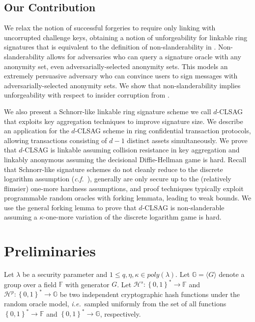 \documentclass{llncs}
\begin{document}
\subsection{Our Contribution}

We relax the notion of successful forgeries to require only linking with uncorrupted challenge keys, obtaining a notion of unforgeability for linkable ring signatures that is equivalent to the definition of non-slanderability in \cite{au2006short}.  Non-slanderability allows for adversaries who can query a signature oracle with any anonymity set, even adversarially-selected anonymity sets. This models an extremely persuasive adversary who can convince users to sign messages with adversarially-selected anonymity sets. We show that non-slanderability implies unforgeability with respect to insider corruption from \cite{bender2006ring}.

We also present a Schnorr-like linkable ring signature scheme we call $d$-CLSAG that exploits key aggregation techniques to improve signature size. We describe an application for the $d$-CLSAG scheme in ring confidential transaction protocols, allowing transactions consisting of $d-1$ distinct assets simultaneously. We prove that $d$-CLSAG is linkable assuming collision resistance in key aggregation and linkably anonymous assuming the decisional Diffie-Hellman game is hard. Recall that Schnorr-like signature schemes do not cleanly reduce to the discrete logarithm assumption (\textit{c.f.}\ \cite{paillier2005discrete}), generally are only secure up to the (relatively flimsier) one-more hardness assumptions, and proof techniques typically exploit programmable random oracles with forking lemmata, leading to weak bounds. We use the general forking lemma to prove that $d$-CLSAG is non-slanderable assuming a $\kappa$-one-more variation of the discrete logarithm game is hard.


\section{Preliminaries}

Let $\lambda$ be a security parameter and $1 \leq q, \eta, \kappa \in poly(\lambda)$. Let $\mathbb{G} = \langle G \rangle$ denote a group over a field $\mathbb{F}$ with generator $G$.  Let $\mathcal{H}^s:\left\{0,1\right\}^* \to \mathbb{F}$ and $\mathcal{H}^p:\left\{0,1\right\}^* \to \mathbb{G}$ be two independent cryptographic hash functions under the random oracle model, \textit{i.e.}\ sampled uniformly from the set of all functions $\left\{0,1\right\}^* \to \mathbb{F}$ and $\left\{0,1\right\}^* \to \mathbb{G}$, respectively.
\end{document}
